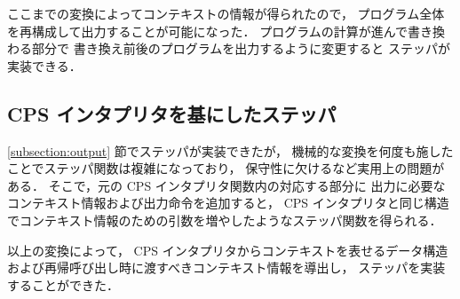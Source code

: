 ここまでの変換によってコンテキストの情報が得られたので，
プログラム全体を再構成して出力することが可能になった．
プログラムの計算が進んで書き換わる部分で
書き換え前後のプログラムを出力するように変更すると
ステッパが実装できる．

\subsection{CPS インタプリタを基にしたステッパ}
\label{subsection:stepper}

\ref{subsection:output} 節でステッパが実装できたが，
機械的な変換を何度も施したことでステッパ関数は複雑になっており，
保守性に欠けるなど実用上の問題がある．
そこで，元の CPS インタプリタ関数内の対応する部分に
出力に必要なコンテキスト情報および出力命令を追加すると，
CPS インタプリタと同じ構造でコンテキスト情報のための引数を増やしたようなステッパ関数を得られる．

以上の変換によって，
CPS インタプリタからコンテキストを表せるデータ構造および再帰呼び出し時に渡すべきコンテキスト情報を導出し，
ステッパを実装することができた．

